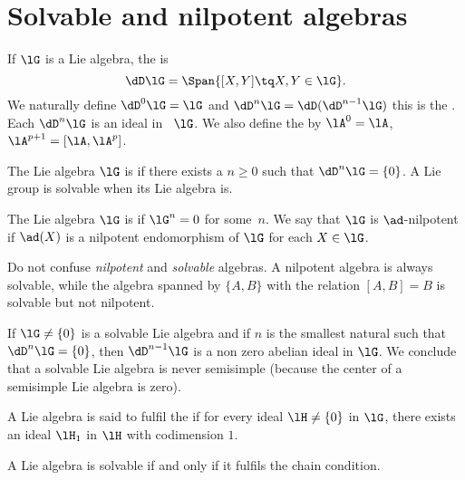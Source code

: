 \section{Solvable and nilpotent algebras}

If $\lG$ is a Lie algebra, the  is
\[
   \dD\lG=\Span\{[X,Y]\tq X,Y\in\lG\}.
\]
We naturally define $\dD^0\lG=\lG$ and $\dD^n\lG=\dD(\dD^{n-1}\lG)$ this is the . Each $\dD^n\lG$ is an ideal in~ $\lG$. We also define the  by $\lA^0=\lA$, $\lA^{p+1}=[\lA,\lA^p]$.

\begin{definition}
The Lie algebra $\lG$ is  if there exists a $n\geq 0$ such that $\dD^n\lG=\{0\}$. A Lie group is solvable when its Lie algebra is.

    The Lie algebra  \( \lG\) is  if \( \lG^n=0\) for some~\( n\). We say that \( \lG\) is \( \ad\)-nilpotent if \( \ad(X)\) is a nilpotent endomorphism of \( \lG\) for each \( X\in\lG\).
\end{definition}

Do not confuse \emph{nilpotent} and \emph{solvable} algebras. A nilpotent algebra is always solvable, while the algebra spanned by $\{ A,B \}$ with the relation $[A,B]=B$ is solvable but not nilpotent.

If $\lG\neq\{0\}$ is a solvable Lie algebra and if $n$ is the smallest natural such that $\dD^n\lG=\{0\}$, then $\dD^{n-1}\lG$ is a non zero abelian ideal in $\lG$. We conclude that a solvable Lie algebra is never semisimple (because the center of a semisimple Lie algebra is zero).

A Lie algebra is said to fulfil the  if for every ideal $\lH\neq\{0\}$ in $\lG$, there exists an ideal $\lH_1$ in $\lH$ with codimension $1$.

\begin{lemma}
A Lie algebra is solvable if and only if it fulfils the chain condition.
\end{lemma}


